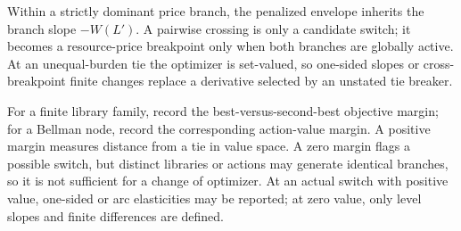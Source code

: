 Within a strictly dominant price branch, the penalized envelope inherits the
branch slope \(-W(L')\). A pairwise crossing is only a candidate switch; it
becomes a resource-price breakpoint only when both branches are globally
active. At an unequal-burden tie the optimizer is set-valued, so one-sided
slopes or cross-breakpoint finite changes replace a derivative selected by an
unstated tie breaker.

For a finite library family, record the best-versus-second-best objective
margin; for a Bellman node, record the corresponding action-value margin. A
positive margin measures distance from a tie in value space. A zero margin
flags a possible switch, but distinct libraries or actions may generate
identical branches, so it is not sufficient for a change of optimizer. At an
actual switch with positive value, one-sided or arc elasticities may be
reported; at zero value, only level slopes and finite differences are defined.
